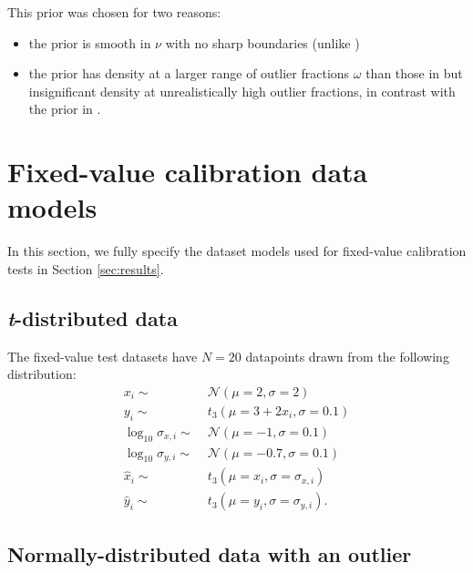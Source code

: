 \documentclass[fleqn,usenatbib]{mnras}
\begin{document}
This prior was chosen for two reasons:
\begin{itemize}
    \item the prior is smooth in $\nu$ with no sharp boundaries (unlike
          \citet{Gelman:2013})
    \item the prior has density at a larger range of outlier fractions $\omega$
          than those in \citet{Juarez:2010, Ding:2014} but insignificant density
          at unrealistically high outlier fractions, in contrast with the prior
          in \citet{Feeney:2018}.
\end{itemize}

\section{Fixed-value calibration data models}
\label{sec:data-models}

In this section, we fully specify the dataset models used for fixed-value
calibration tests in Section \ref{sec:results}.

\subsection{\textit{t}-distributed data}
\label{sec:data-models.t}

The fixed-value test datasets have $N = 20$ datapoints drawn from the following
distribution:
\begin{align}
    x_i \sim&\; \mathcal N (\mu = 2, \sigma = 2) \\
    y_i \sim&\; t_{3} (\mu = 3 + 2 x_i, \sigma = 0.1) \\
    \log_{10} \sigma_{x, i} \sim&\; \mathcal N (\mu = -1, \sigma = 0.1) \\
    \log_{10} \sigma_{y, i} \sim&\; \mathcal N (\mu = -0.7, \sigma = 0.1) \\
    \hat{x}_i \sim&\; t_{3} (\mu = x_i, \sigma = \sigma_{x, i}) \\
    \hat{y}_i \sim&\; t_{3} (\mu = y_i, \sigma = \sigma_{y, i}).
\end{align}

\subsection{Normally-distributed data with an outlier}
\label{sec:data-models.outlier}
\end{document}
